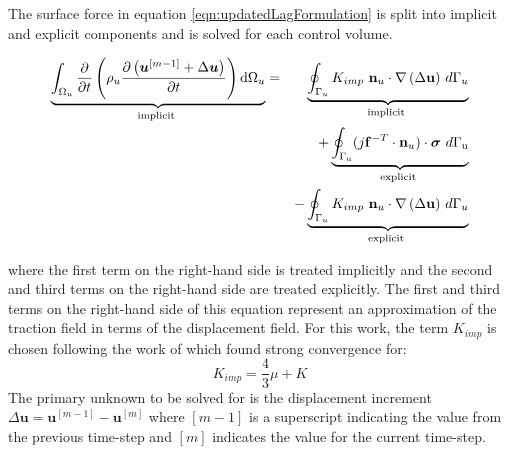 \documentclass[sn-mathphys,Numbered,draft]{sn-jnl}%
\begin{document}
The surface force in equation \ref{eqn:updatedLagFormulation} is split into implicit and explicit components and is solved for each control volume.

\begin{eqnarray} \label{eqn:MomentumImplicitExplicit}
\underbrace{\int_{\Omega_u} \frac{\partial}{\partial t}\left(\rho_u \frac{\partial\left(\boldsymbol{u}^{[m-1]}+\Delta \boldsymbol{u}\right)}{\partial t}\right) \mathrm{d} \Omega_u}_{\text {implicit }} &=& \underbrace{\oint_{\mathrm{\Gamma}_u}{K_{imp}\  \mathbf{n}_u\cdot\mathrm{\nabla}\left(\mathrm{\Delta \mathbf{u}}\right)}\ d\mathrm{\Gamma}_u}_{\text {implicit }} \notag \\
    &&+\underbrace{\oint_{\mathrm{\Gamma_u}}(j\mathbf{f}^{-T}\cdot{\mathbf{n}_u)\cdot\boldsymbol{\sigma}}\ d\mathrm{\Gamma_u}}_{\text {explicit }} \notag\\
    &&-\underbrace{\oint_{\mathrm{\Gamma}_u}{K_{imp}\ 
 \mathbf{n}_u\cdot\mathrm{\nabla}\left(\mathrm{\Delta \mathbf{u}}\right)}\ d\mathrm{\Gamma}_u}_{\text {explicit }}
\end{eqnarray}

where the first term on the right-hand side is treated implicitly and the second and third terms on the right-hand side are treated explicitly. The first and third terms on the right-hand side of this equation represent an approximation of the traction field in terms of the displacement field. For this work, the term $K_{imp}$ is chosen following the work of \citet{jasak_application_2000} which found strong convergence for:
\begin{equation}
K_{imp}=\frac{4}{3}\mu+K
\end{equation}
The primary unknown to be solved for is the displacement increment $\Delta \boldsymbol{u}=\boldsymbol{u}^{[m-1]}-\boldsymbol{u}^{[m]}$ where $[m-1]$ is a superscript indicating the value from the previous time-step and $[m]$ indicates the value for the current time-step. 
\end{document}
